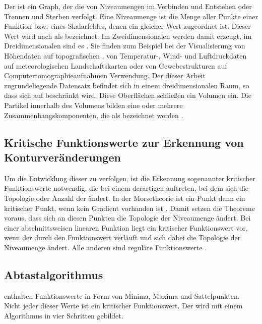 Der  ist ein Graph, der die  von Niveaumengen im Verbinden und Entstehen oder Trennen und Sterben verfolgt. Eine Niveaumenge ist die Menge aller Punkte einer Funktion bzw. eines Skalarfeldes, denen ein gleicher Wert zugeordnet ist. Dieser Wert wird nach \cite[S.~1]{carr2010flexibleIsosurfaces} als  bezeichnet. Im Zweidimensionalen werden damit  erzeugt, im Dreidimensionalen sind es . Sie finden zum Beispiel bei der Visualisierung von Höhendaten auf topografischen \cite{hurni2010landform} \cite{openstreetmapContours}, von Temperatur-, Wind- und Luftdruckdaten auf meteorologischen Landschaftskarten \cite{hopkins1996weather} oder von Gewebestrukturen auf Computertomographieaufnahmen \cite{tang2014ctImages} Verwendung.
Der dieser Arbeit zugrundeliegende Datensatz befindet sich in einem dreidimensionalen Raum, so dass sich auf  beschränkt wird. Diese Oberflächen schließen ein Volumen ein. Die Partikel innerhalb des Volumens bilden eine oder mehrere Zusammenhangskomponenten, die als  bezeichnet werden \cite[S.~2]{carr2001computingCountourTrees}.

\subsection*{Kritische Funktionswerte zur Erkennung von Konturveränderungen}
Um die Entwicklung dieser  zu verfolgen, ist die Erkennung sogenannter kritischer Funktionswerte notwendig, die bei einem derartigen  auftreten, bei dem sich die Topologie oder Anzahl der  ändert. In der Morsetheorie ist ein Punkt dann ein kritischer Punkt, wenn kein Gradient vorhanden ist  \cite{milnor1963morse} \cite{shinagawa1991surfaceBasedOnMorse}. Damit setzen die Theoreme voraus, dass sich an diesen Punkten die Topologie der Niveaumenge ändert. Bei einer abschnittsweisen linearen Funktion liegt ein kritischer Funktionswert vor, wenn der  durch den Funktionswert verläuft und sich dabei die Topologie der Niveaumenge ändert. Alle anderen sind reguläre Funktionswerte \cite{carr2010flexibleIsosurfaces} \cite{chiang2005contourTreesUsingMonotonePaths}.

\subsection*{Abtastalgorithmus}\label{sec:related:konturAbtast}
 enthalten Funktionswerte in Form von Minima, Maxima und Sattelpunkten. Nicht jeder dieser Werte ist ein kritischer Funktionswert. Der  wird mit einem Algorithmus in vier Schritten gebildet.

